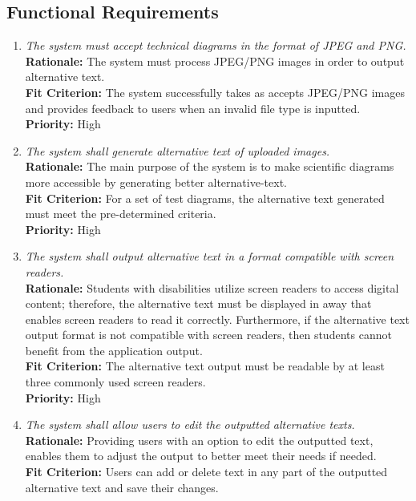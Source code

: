 \documentclass[12pt]{article}
\begin{document}
\subsection{Functional Requirements}
\begin{enumerate}[label=FR \arabic*., wide=0pt, leftmargin=*]
  \item \emph{The system must accept technical diagrams in the format of JPEG and PNG.}\\[2mm]
    {\bf Rationale:} The system must process JPEG/PNG images in order to output alternative text. \\
    {\bf Fit Criterion:} The system successfully takes as accepts JPEG/PNG images and provides feedback to users when an invalid file type is inputted.  \\
    {\bf Priority:} High
  \item \emph{The system shall generate alternative text of uploaded images.}\\[2mm]
    {\bf Rationale:} The main purpose of the system is to make scientific diagrams more accessible by generating better alternative-text. \\
    {\bf Fit Criterion:} For a set of test diagrams, the alternative text generated must meet the pre-determined criteria.\\
    {\bf Priority:} High
  \item \emph{The system shall output alternative text in a format compatible with screen readers.}\\[2mm]
    {\bf Rationale:} Students with disabilities utilize screen readers to access digital content; therefore, the alternative text must be displayed in away that enables screen readers to read it correctly. Furthermore, if the alternative text output format is not compatible with screen readers, then students cannot benefit from the application output.\\
    {\bf Fit Criterion:} The alternative text output must be readable by at least three commonly used screen readers.\\
    {\bf Priority:} High
  \item \emph{The system shall allow users to edit the outputted alternative texts.}\\[2mm] 
    {\bf Rationale:} Providing users with an option to edit the outputted text, enables them to adjust the output to better meet their needs if needed.\\
    {\bf Fit Criterion:} Users can add or delete text in any part of the outputted alternative text and save their changes.\\

\end{enumerate}
\end{document}
